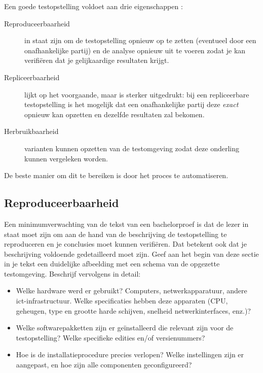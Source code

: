 Een goede testopstelling voldoet aan drie eigenschappen \autocite{Liberman2015}:

\begin{description}
  \item[Reproduceerbaarheid] in staat zijn om de testopstelling opnieuw op te zetten (e\-ven\-tu\-eel door een onafhankelijke partij) en de analyse opnieuw uit te voeren zodat je kan verifiëren dat je gelijkaardige resultaten krijgt.
  \item[Repliceerbaarheid] lijkt op het voorgaande, maar is sterker uitgedrukt: bij een repliceerbare testopstelling is het mogelijk dat een onafhankelijke partij deze \textit{exact} opnieuw kan opzetten en dezelfde resultaten zal bekomen.
  \item[Herbruikbaarheid] varianten kunnen opzetten van de testomgeving zodat deze onderling kunnen vergeleken worden.
\end{description}

De beste manier om dit te bereiken is door het proces te automatiseren.

\subsection{Reproduceerbaarheid}%
\label{ssec:reproduceerbaarheid}

Een minimumverwachting van de tekst van een bachelorproef is dat de lezer in staat moet zijn om aan de hand van de beschrijving de testopstelling te reproduceren en je conclusies moet kunnen verifiëren. Dat betekent ook dat je beschrijving voldoende gedetailleerd moet zijn. Geef aan het begin van deze sectie in je tekst een duidelijke afbeelding met een schema van de opgezette testomgeving. Beschrijf vervolgens in detail:

\begin{itemize}
  \item Welke hardware werd er gebruikt? Computers, netwerkapparatuur, andere ict-infrastructuur. Welke specificaties hebben deze apparaten (CPU, geheugen, type en grootte harde schijven, snelheid netwerkinterfaces, enz.)?
  \item Welke softwarepakketten zijn er geïnstalleerd die relevant zijn voor de testopstelling? Welke specifieke edities en/of versienummers?
  \item Hoe is de installatieprocedure precies verlopen? Welke instellingen zijn er aangepast, en hoe zijn alle componenten geconfigureerd?
\end{itemize}

